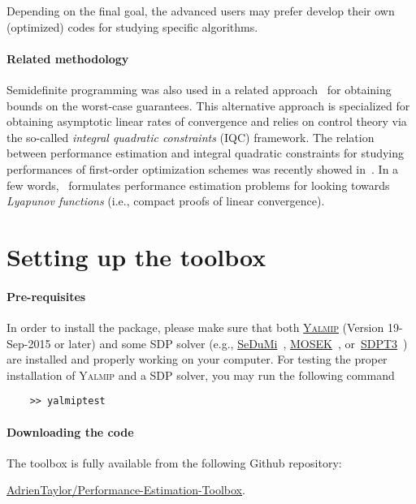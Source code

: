 \documentclass[11pt,a4paper]{article}
\begin{document}
	Depending on the final goal, the advanced users may prefer develop their own (optimized) codes for studying specific algorithms.
	\paragraph{Related methodology} Semidefinite programming was also used in a related approach~\cite{lessard2014analysis} for obtaining bounds on the worst-case guarantees. This alternative approach is specialized for obtaining asymptotic linear rates of convergence and relies on control theory via the so-called \emph{integral quadratic constraints} (IQC) framework. The relation between performance estimation and integral quadratic constraints for studying performances of first-order optimization schemes was recently showed in~\cite{taylor2018lyapunov}. In a few words,~\cite{taylor2018lyapunov} formulates performance estimation problems for looking towards \emph{Lyapunov functions} (i.e., compact proofs of linear convergence).
	
	\clearpage
	\section{Setting up the toolbox}		%
	
	
	\paragraph{Pre-requisites} In order to install the package, please make sure that both \href{https://yalmip.github.io/}{\textsc{Yalmip}} (Version 19-Sep-2015 or later) and some SDP solver (e.g., \href{http://sedumi.ie.lehigh.edu/}{SeDuMi}~\cite{Article:Sedumi}, \href{https://mosek.com/}{MOSEK}~\cite{Article:Mosek}, or~\href{http://www.math.nus.edu.sg/~mattohkc/sdpt3.html}{SDPT3}~\cite{Article:sdpt3}) are installed and properly working on your computer. For testing the proper installation of \textsc{Yalmip} and a SDP solver, you may run the following command
	\begin{verbatim}
	>> yalmiptest
	\end{verbatim}
	\paragraph{Downloading the code} The toolbox is fully available from the following {\sc Github} repository: \begin{center}
		\href{https://github.com/AdrienTaylor/Performance-Estimation-Toolbox}{\sc AdrienTaylor/Performance-Estimation-Toolbox}.\\
	\end{center}
	
\end{document}
